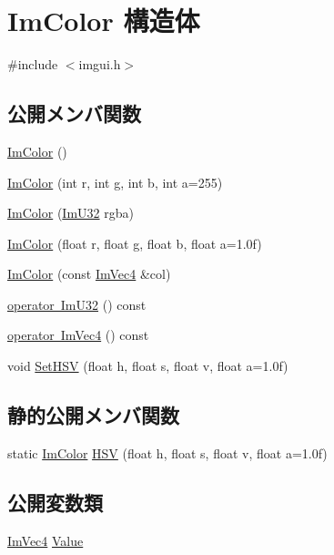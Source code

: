 \hypertarget{struct_im_color}{}\section{Im\+Color 構造体}
\label{struct_im_color}


{\ttfamily \#include $<$imgui.\+h$>$}

\subsection*{公開メンバ関数}
\begin{DoxyCompactItemize}
\item 
\mbox{\hyperlink{struct_im_color_a95206b688dcc03f725790538c74f4526}{Im\+Color}} ()
\item 
\mbox{\hyperlink{struct_im_color_ab4ba02f8290d5dadc1ebc57b2c8a9cbe}{Im\+Color}} (int r, int g, int b, int a=255)
\item 
\mbox{\hyperlink{struct_im_color_ad306332841a2b1f903f40262a19f9412}{Im\+Color}} (\mbox{\hyperlink{imgui_8h_a118cff4eeb8d00e7d07ce3d6460eed36}{Im\+U32}} rgba)
\item 
\mbox{\hyperlink{struct_im_color_a92b53917ca9d90a7207b18270ff5453d}{Im\+Color}} (float r, float g, float b, float a=1.\+0f)
\item 
\mbox{\hyperlink{struct_im_color_aa5306926b3ef766a8647b26bdfd9f8d2}{Im\+Color}} (const \mbox{\hyperlink{struct_im_vec4}{Im\+Vec4}} \&col)
\item 
\mbox{\hyperlink{struct_im_color_a4f4fc53e0676d50404d6d5ffcf16637f}{operator Im\+U32}} () const
\item 
\mbox{\hyperlink{struct_im_color_a10f1de242f13c93f8be64545e4cbcb0a}{operator Im\+Vec4}} () const
\item 
void \mbox{\hyperlink{struct_im_color_afcff20160db703b956d56e5a9fa88e24}{Set\+H\+SV}} (float h, float s, float v, float a=1.\+0f)
\end{DoxyCompactItemize}
\subsection*{静的公開メンバ関数}
\begin{DoxyCompactItemize}
\item 
static \mbox{\hyperlink{struct_im_color}{Im\+Color}} \mbox{\hyperlink{struct_im_color_ac8cb52119648523038818a613becf010}{H\+SV}} (float h, float s, float v, float a=1.\+0f)
\end{DoxyCompactItemize}
\subsection*{公開変数類}
\begin{DoxyCompactItemize}
\item 
\mbox{\hyperlink{struct_im_vec4}{Im\+Vec4}} \mbox{\hyperlink{struct_im_color_a4cf43bd58e30decaa0248f839fc85e95}{Value}}
\end{DoxyCompactItemize}


